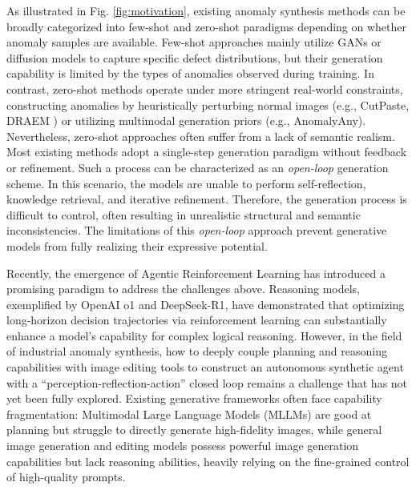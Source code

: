\documentclass[sigconf]{acmart}
\begin{document}
As illustrated in Fig. \ref{fig:motivation}, existing anomaly synthesis methods can be broadly categorized into few-shot and zero-shot paradigms depending on whether anomaly samples are available. Few-shot approaches\cite{DBLP:conf/wacv/ZhangCHL21, DBLP:conf/aaai/DuanH0023, DBLP:conf/aaai/HuZYDCLWW24, DBLP:conf/eccv/YangCCFLLC24, DBLP:conf/eccv/GuiGLWW24, DBLP:conf/cvpr/SongPB0C0Y25, DBLP:journals/corr/abs-2410-14987, DBLP:conf/cvpr/JinPHHWCWZCLW25, DBLP:conf/icmcs/LinCZL21} mainly utilize GANs\cite{DBLP:journals/corr/GoodfellowPMXWOCB14} or diffusion models\cite{DBLP:conf/nips/HoJA20} to capture specific defect distributions, but their generation capability is limited by the types of anomalies observed during training. In contrast, zero-shot methods\cite{DBLP:conf/cvpr/LiSYP21, DBLP:conf/iccv/ZavrtanikKS21, DBLP:conf/eccv/SchluterTHK22, DBLP:conf/cvpr/Zhang0Z24, DBLP:conf/cvpr/SunCDF25, DBLP:conf/cvpr/Zhao25} operate under more stringent real-world constraints, constructing anomalies by heuristically perturbing normal images (e.g., CutPaste\cite{DBLP:conf/cvpr/LiSYP21}, DRAEM \cite{DBLP:conf/iccv/ZavrtanikKS21}) or utilizing multimodal generation priors (e.g., AnomalyAny\cite{DBLP:conf/cvpr/SunCDF25}). Nevertheless, zero-shot approaches often suffer from a lack of semantic realism. Most existing methods adopt a single-step generation paradigm without feedback or refinement. Such a process can be characterized as an \emph{open-loop} generation scheme. In this scenario, the models are unable to perform self-reflection, knowledge retrieval, and iterative refinement. Therefore, the generation process is difficult to control, often resulting in unrealistic structural and semantic inconsistencies. The limitations of this \emph{open-loop} approach prevent generative models from fully realizing their expressive potential.

Recently, the emergence of Agentic Reinforcement Learning has introduced a promising paradigm to address the challenges above. Reasoning models, exemplified by OpenAI o1\cite{DBLP:journals/corr/abs-2412-16720} and DeepSeek-R1\cite{DBLP:journals/corr/abs-2501-12948}, have demonstrated that optimizing long-horizon decision trajectories via reinforcement learning can substantially enhance a model’s capability for complex logical reasoning. However, in the field of industrial anomaly synthesis, how to deeply couple planning and reasoning capabilities with image editing tools to construct an autonomous synthetic agent with a ``perception-reflection-action'' closed loop remains a challenge that has not yet been fully explored. Existing generative frameworks often face capability fragmentation: Multimodal Large Language Models (MLLMs) are good at planning but struggle to directly generate high-fidelity images, while general image generation and editing models possess powerful image generation capabilities but lack reasoning abilities, heavily relying on the fine-grained control of high-quality prompts.
\end{document}
